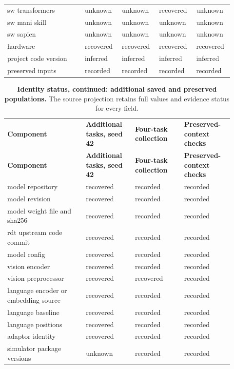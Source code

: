 \begin{longtable}{p{0.320\linewidth} p{0.150\linewidth} p{0.150\linewidth} p{0.150\linewidth} p{0.150\linewidth}}
sw transformers & unknown & unknown & recovered & unknown \\
sw mani skill & unknown & unknown & unknown & unknown \\
sw sapien & unknown & unknown & unknown & unknown \\
hardware & recovered & recovered & recovered & recovered \\
project code version & inferred & inferred & inferred & inferred \\
preserved inputs & recorded & recorded & recorded & recorded \\
\end{longtable}

\setlength{\tabcolsep}{2pt}
\begin{longtable}{p{0.320\linewidth} p{0.200\linewidth} p{0.200\linewidth} p{0.200\linewidth}}
\noalign{\addtocounter{table}{-1}}
\caption*{\textbf{Identity status, continued: additional saved and preserved populations.} The source projection retains full values and evidence status for every field.}\\
\toprule
\textbf{Component} & \textbf{Additional tasks, seed 42} & \textbf{Four-task collection} & \textbf{Preserved-context checks} \\
\midrule\endfirsthead
\toprule
\textbf{Component} & \textbf{Additional tasks, seed 42} & \textbf{Four-task collection} & \textbf{Preserved-context checks} \\
\midrule\endhead
\bottomrule\endfoot
model repository & recovered & recorded & recorded \\
model revision & recovered & recorded & recorded \\
model weight file and sha256 & recovered & recorded & recorded \\
rdt upstream code commit & recovered & recorded & recorded \\
model config & recovered & recorded & recorded \\
vision encoder & recovered & recorded & recorded \\
vision preprocessor & recovered & recovered & recorded \\
language encoder or embedding source & recovered & recorded & recorded \\
language baseline & recovered & recorded & recorded \\
language positions & recovered & recorded & recorded \\
adaptor identity & recovered & recorded & recorded \\
simulator package versions & unknown & recorded & recorded \\

\end{longtable}
